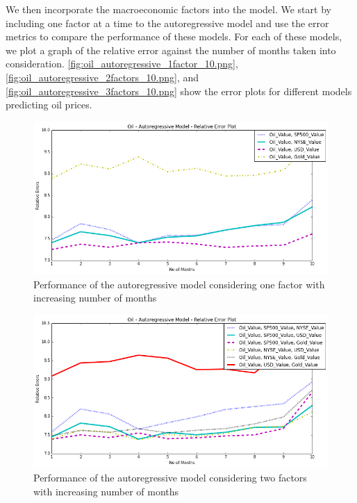 \documentclass[runningheads]{llncs}
\begin{document}
We then incorporate the macroeconomic factors into the model. We start by including one factor at a time to the autoregressive model and use the error metrics to compare the performance of these models. For each of these models, we plot a graph of the relative error against the number of months taken into consideration. \autoref{fig:oil_autoregressive_1factor_10.png}, \autoref{fig:oil_autoregressive_2factors_10.png}, and \autoref{fig:oil_autoregressive_3factors_10.png} show the error plots for different models predicting oil prices. 

\begin{figure}
\centering
\includegraphics[width=\textwidth]{oil_autoregressive_1factor_10.png}
\caption{Performance of the autoregressive model considering one factor with increasing number of months}
\label{fig:oil_autoregressive_1factor_10.png}
\end{figure}

\begin{figure}
\centering
\includegraphics[width=\textwidth]{oil_autoregressive_2factors_10.png}
\caption{Performance of the autoregressive model considering two factors with increasing number of months}
\label{fig:oil_autoregressive_2factors_10.png}
\end{figure}
\end{document}
